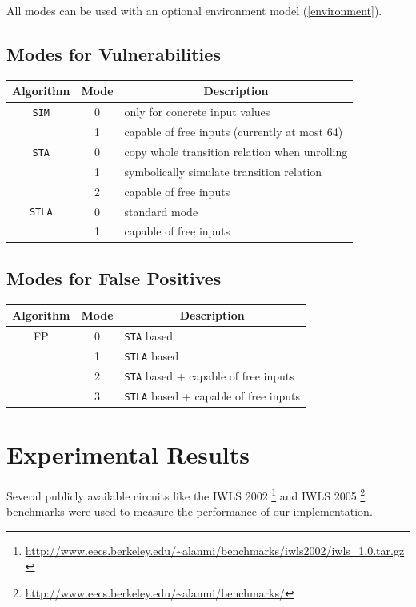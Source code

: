 \documentclass[a4paper,10pt]{article}
\begin{document}
All modes can be used with an optional environment model (\ref{environment}).

\subsection{Modes for Vulnerabilities}
{%
\newcommand{\mc}[3]{\multicolumn{#1}{#2}{#3}}
\begin{center}
\begin{tabular}{c|c|l}
Algorithm & Mode & \mc{1}{c}{Description}\\
\hline \hline
\texttt{SIM}  & 0 & only for concrete input values\\
              & 1 & capable of free inputs (currently at most 64)\\
\hline
\texttt{STA} & 0 & copy whole transition relation when unrolling\\
  & 1 & symbolically simulate transition relation \\
  & 2 & capable of free inputs\\
\hline  
\texttt{STLA} & 0 & standard mode\\
  & 1 & capable of free inputs
\end{tabular}
\end{center}
}%

\subsection{Modes for False Positives}
{%
\newcommand{\mc}[3]{\multicolumn{#1}{#2}{#3}}
\begin{center}
\begin{tabular}{c|c|l}
Algorithm & Mode & \mc{1}{c}{Description}\\
\hline \hline
FP & 0 & \texttt{STA} based\\
  & 1 & \texttt{STLA} based \\
  & 2 & \texttt{STA} based + capable of free inputs\\
  & 3 & \texttt{STLA} based + capable of free inputs
\end{tabular}
\end{center}
}%

\newpage
\section{Experimental Results}
Several publicly available circuits like the 
IWLS 2002 \footnote{\url{http://www.eecs.berkeley.edu/~alanmi/benchmarks/iwls2002/iwls_1.0.tar.gz}}
and IWLS 2005 \footnote{\url{http://www.eecs.berkeley.edu/~alanmi/benchmarks/}} benchmarks
were used to measure the performance of our implementation.
\end{document}
